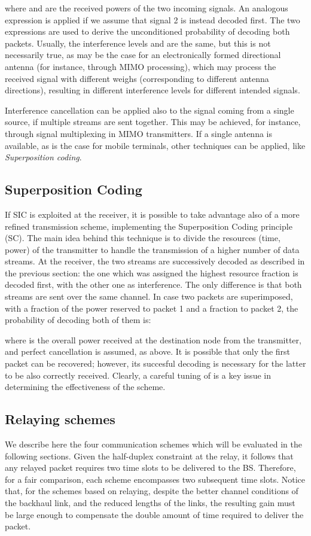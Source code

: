 \documentclass[12pt, letterpaper, onecolumn, draftcls]{IEEEtran}
\begin{document}
where  and  are the received powers of the two incoming signals. An analogous expression is applied if we assume that signal 2 is instead decoded first. The two expressions are used to derive the unconditioned probability of decoding both packets.
Usually, the interference levels  and  are the same, but this is not necessarily true, as may be the case for an electronically formed directional antenna (for instance, through MIMO processing), which may process the received signal with different weighs (corresponding to different antenna directions), resulting in different interference levels for different intended signals.

Interference cancellation can be applied also to the signal coming from a single source, if multiple streams are sent together. This may be achieved, for instance, through signal multiplexing in MIMO transmitters. If a single antenna is available, as is the case for mobile terminals, other techniques can be applied, like \textit{Superposition coding}.


\subsection{Superposition Coding}
If SIC is exploited at the receiver, it is possible to take advantage also of a more refined transmission scheme, implementing the Superposition Coding principle (SC). The main idea behind this technique is to divide the resources (time, power) of the transmitter to handle the transmission of a higher number of data streams.
At the receiver, the two streams are successively decoded as described in the previous section: the one which was assigned the highest resource fraction is decoded first, with the other one as interference. The only difference is that both streams are sent over the same channel. In case two packets are superimposed, with a fraction  of the power reserved to packet 1 and a fraction  to packet 2, the probability of decoding both of them is:

where  is the overall power received at the destination node from the transmitter, and perfect cancellation is assumed, as above. It is possible that only the first packet can be recovered; however, its succesful decoding is necessary for the latter to be also correctly received.
Clearly, a careful tuning of  is a key issue in determining the effectiveness of the scheme.

\subsection{Relaying schemes}
We describe here the four communication schemes which will be evaluated in the following sections.
Given the half-duplex constraint at the relay, it follows that any relayed packet requires two time slots to be delivered to the BS.
Therefore, for a fair comparison, each scheme encompasses two subsequent time slots.
Notice that, for the schemes based on relaying, despite the better channel conditions of the backhaul link, and the reduced lengths of the links, the resulting gain must be large enough to compensate the double amount of time required to deliver the packet.
\end{document}
